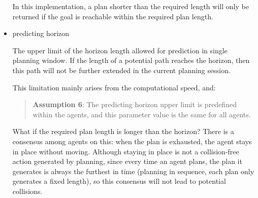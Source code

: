 \begin{itemize}
    In this implementation, a plan shorter than the required length will only be returned if the goal is reachable within the required plan length.
    
    \item predicting horizon
    
    The upper limit of the horizon length allowed for prediction in single planning window.
    If the length of a potential path reaches the horizon, then this path will not be further extended in the current planning session.
    
    This limitation mainly arises from the computational speed, and:
    \begin{quotation}
        \textbf{Assumption 6}: 
        The predicting horizon upper limit is predefined within the agents, and this parameter value is the same for all agents.
    \end{quotation}

    What if the required plan length is longer than the horizon? 
    There is a consensus among agents on this: 
    when the plan is exhausted, the agent stays in place without moving. 
    Although staying in place is not a collision-free action generated by planning, 
    since every time an agent plans, the plan it generates is always the furthest in time 
    (planning in sequence, each plan only generates a fixed length), 
    so this consensus will not lead to potential collisions.
\end{itemize}


